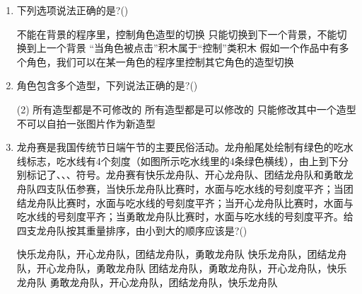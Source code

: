 \documentclass[10pt, a4paper]{article}
\begin{document}
\begin{enumerate}
        \item 下列选项说法正确的是?(\qquad)
        \begin{tasks}
            \task 不能在背景的程序里，控制角色造型的切换
            \task 只能切换到下一个背景，不能切换到上一个背景
            \task “当角色被点击”积木属于“控制”类积木
            \task 假如一个作品中有多个角色，我们可以在某一角色的程序里控制其它角色的造型切换
        \end{tasks}

        \item 角色包含多个造型，下列说法正确的是?(\qquad)
        \begin{tasks}(2)
            \task 所有造型都是不可修改的
            \task 所有造型都是可以修改的
            \task 只能修改其中一个造型
            \task 不可以自拍一张图片作为新造型
        \end{tasks}

        \item 龙舟赛是我国传统节日端午节的主要民俗活动。龙舟船尾处绘制有绿色的吃水线标志，吃水线有4个刻度（如图所示吃水线里的4条绿色横线），由上到下分别标记了、、、符号。龙舟赛有快乐龙舟队、开心龙舟队、团结龙舟队和勇敢龙舟队四支队伍参赛，当快乐龙舟队比赛时，水面与吃水线的号刻度平齐；当团结龙舟队比赛时，水面与吃水线的号刻度平齐；当开心龙舟队比赛时，水面与吃水线的号刻度平齐；当勇敢龙舟队比赛时，水面与吃水线的号刻度平齐。给四支龙舟队按其重量排序，由小到大的顺序应该是?(\qquad)
        \begin{tasks}
            \task 快乐龙舟队，开心龙舟队，团结龙舟队，勇敢龙舟队
            \task 快乐龙舟队，团结龙舟队，开心龙舟队，勇敢龙舟队
            \task 团结龙舟队，勇敢龙舟队，开心龙舟队，快乐龙舟队
            \task 勇敢龙舟队，开心龙舟队，团结龙舟队，快乐龙舟队
        \end{tasks}
    \end{enumerate}
\end{document}
